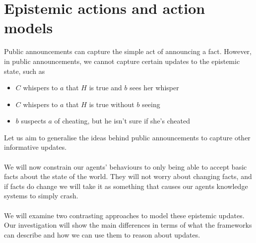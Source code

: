 \section{Epistemic actions and action models} \label{estAct}
Public announcements can capture the simple act of announcing a fact.
However, in public announcements, we cannot capture certain updates to the
epistemic state, such as
\begin{itemize} 
  \item $C$ whispers to $a$ that $H$ is true and $b$ sees her whisper
  \item $C$ whispers to $a$ that $H$ is true without $b$ seeing
  \item $b$ suspects $a$ of cheating, but he isn't sure if she's cheated
\end{itemize}
Let us aim to generalise the ideas behind public announcements to capture other
informative updates.\\
\\
We will now constrain our agents' behaviours to only being able to accept basic facts about the
state of the world.
They will not worry about changing facts, and if facts do change we will take it
as something that causes our agents knowledge systems to simply crash.\\
\\
We will examine two contrasting approaches to model these epistemic updates.
Our investigation will show the main differences in terms of what the frameworks
can describe and how we can use them to reason about updates.
